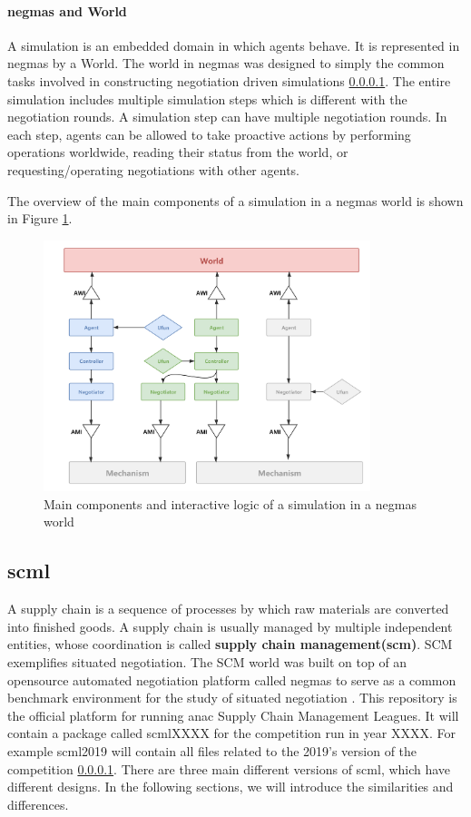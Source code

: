 \paragraph{\gls{negmas} and World}
A simulation is an embedded domain in which agents behave. It is represented in \gls{negmas} by a World. The world in \gls{negmas} was designed to simply the common tasks involved in constructing negotiation driven simulations \ref{}. The entire simulation includes multiple simulation steps which is different with the negotiation rounds. A simulation step can have multiple negotiation rounds. In each step, agents can be allowed to take proactive actions by performing operations worldwide, reading their status from the world, or requesting/operating negotiations with other agents.

The overview of the main components of a simulation in a \gls{negmas} world is shown in Figure \ref{fig:overview-negmas}.

\begin{figure}[htbp]
\centering
\includegraphics[width=0.85\textwidth]{./images/overview-negmas.png}
\caption{Main components and interactive logic of a simulation in a \gls{negmas} world}
\label{fig:overview-negmas}
\end{figure}

\subsection{\gls{scml}} \label{background-scml}
A supply chain is a sequence of processes by which raw materials are converted into finished goods. A supply chain is usually managed by multiple independent entities, whose coordination is called \textbf{supply chain management(\gls{scm})}. SCM exemplifies situated negotiation. The SCM world was built on top of an opensource automated negotiation platform called \gls{negmas} to serve as a common benchmark environment for the study of situated negotiation \parencite{Mohammad2019}. This repository is the official platform for running \gls{anac} Supply Chain Management Leagues. It will contain a package called scmlXXXX for the competition run in year XXXX. For example scml2019 will contain all files related to the 2019’s version of the competition \ref{}.
There are three main different versions of \gls{scml}, which have different designs. In the following sections, we will introduce the similarities and differences. 

